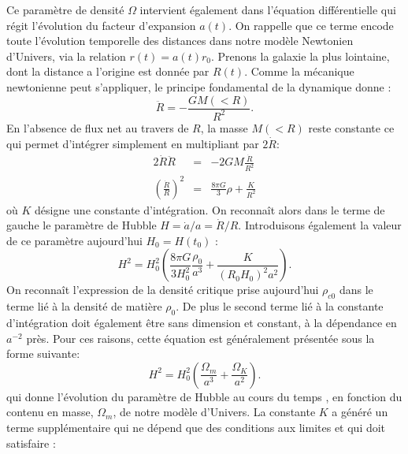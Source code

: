 Ce paramètre de densité $\Omega$ intervient également dans l'équation différentielle qui régit l'évolution du facteur d'expansion $a(t)$. On rappelle que ce terme encode toute l'évolution temporelle des distances dans notre modèle Newtonien d'Univers, via la relation $r(t)=a(t)r_0$. Prenons la galaxie la plus lointaine, dont la distance a l'origine est donnée par $R(t)$. Comme la mécanique newtonienne peut s'appliquer, le principe fondamental de la dynamique donne :
\begin{equation}
\ddot R=-\frac{GM(<R)}{R^2}.
\end{equation} 
En l'absence de flux net au travers de $R$, la masse $M(<R)$ reste constante ce qui permet d'intégrer simplement en multipliant par $2\dot R$:
\begin{eqnarray}
2\dot R \ddot R &=& -2GM\frac{\dot R}{R^2}\\
\left(\frac{\dot R}{R}\right)^2&=&\frac{8\pi G}{3}\rho +\frac{K}{R^2}
\end{eqnarray}
où $K$ désigne une constante d'intégration. On reconnaît alors dans le terme de gauche le paramètre de Hubble $H=\dot a/a=\dot R/R$. Introduisons également la valeur de ce paramètre aujourd'hui $H_0=H(t_0)$ :
\begin{equation}
H^2=H_0^2(\frac{8\pi G}{3H_0^2}\frac{\rho_0}{a^3}+\frac{K}{(R_0  H_0)^2 a^2}).
\end{equation}
On reconnaît l'expression de la densité critique prise aujourd'hui $\rho_{c0}$ dans le terme lié à la densité de matière $\rho_0$. De plus le second terme lié à la constante d'intégration doit également être sans dimension et constant, à la dépendance en $a^{-2}$ près. Pour ces raisons, cette équation est généralement présentée sous la forme suivante:
\begin{equation}
H^2=H_0^2(\frac{\Omega_m}{a^3}+\frac{\Omega_K}{a^2}).
\label{e:friednewt}
\end{equation}
qui donne l'évolution du paramètre de Hubble au cours du temps , en fonction du contenu en masse, $\Omega_m$, de notre modèle d'Univers. La constante $K$ a généré un terme supplémentaire qui ne dépend que des conditions aux limites et qui doit satisfaire :
